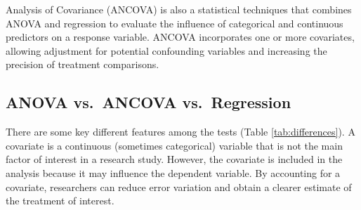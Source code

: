 \documentclass[
]{book}
\begin{document}
Analysis of Covariance (ANCOVA) is also a statistical techniques that combines ANOVA and regression to evaluate the influence of categorical and continuous predictors on a response variable. ANCOVA incorporates one or more covariates, allowing adjustment for potential confounding variables and increasing the precision of treatment comparisons.

\subsection{ANOVA vs.~ANCOVA vs.~Regression}\label{anova-vs.-ancova-vs.-regression}

There are some key different features among the tests (Table \ref{tab:differences}). A covariate is a continuous (sometimes categorical) variable that is not the main factor of interest in a research study. However, the covariate is included in the analysis because it may influence the dependent variable. By accounting for a covariate, researchers can reduce error variation and obtain a clearer estimate of the treatment of interest.
\end{document}
